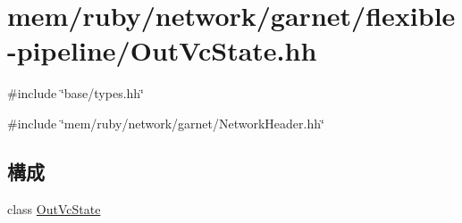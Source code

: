 \hypertarget{OutVcState_8hh}{
\section{mem/ruby/network/garnet/flexible-\/pipeline/OutVcState.hh}
\label{OutVcState_8hh}
}
{\ttfamily \#include \char`\"{}base/types.hh\char`\"{}}\par
{\ttfamily \#include \char`\"{}mem/ruby/network/garnet/NetworkHeader.hh\char`\"{}}\par
\subsection*{構成}
\begin{DoxyCompactItemize}
\item 
class \hyperlink{classOutVcState}{OutVcState}
\end{DoxyCompactItemize}
